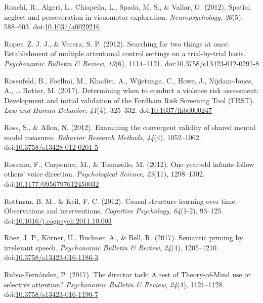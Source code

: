 \documentclass[english,man]{apa6}
\theoremstyle{definition}
\theoremstyle{definition}
\theoremstyle{definition}
\theoremstyle{remark}
\begin{document}
\hypertarget{ref-Ronchi2012}{}
Ronchi, R., Algeri, L., Chiapella, L., Spada, M. S., \& Vallar, G.
(2012). Spatial neglect and perseveration in visuomotor exploration.
\emph{Neuropsychology}, \emph{26}(5), 588--603.
doi:\href{https://doi.org/10.1037/a0029216}{10.1037/a0029216}

\hypertarget{ref-Roper2012}{}
Roper, Z. J. J., \& Vecera, S. P. (2012). Searching for two things at
once: Establishment of multiple attentional control settings on a
trial-by-trial basis. \emph{Psychonomic Bulletin \& Review},
\emph{19}(6), 1114--1121.
doi:\href{https://doi.org/10.3758/s13423-012-0297-8}{10.3758/s13423-012-0297-8}

\hypertarget{ref-Rosenfeld2017}{}
Rosenfeld, B., Foellmi, M., Khadivi, A., Wijetunga, C., Howe, J.,
Nijdam-Jones, A., \ldots{} Rotter, M. (2017). Determining when to
conduct a violence risk assessment: Development and initial validation
of the Fordham Risk Screening Tool (FRST). \emph{Law and Human
Behavior}, \emph{41}(4), 325--332.
doi:\href{https://doi.org/10.1037/lhb0000247}{10.1037/lhb0000247}

\hypertarget{ref-Ross2012}{}
Ross, S., \& Allen, N. (2012). Examining the convergent validity of
shared mental model measures. \emph{Behavior Research Methods},
\emph{44}(4), 1052--1062.
doi:\href{https://doi.org/10.3758/s13428-012-0201-5}{10.3758/s13428-012-0201-5}

\hypertarget{ref-Rossano2012}{}
Rossano, F., Carpenter, M., \& Tomasello, M. (2012). One-year-old
infants follow others' voice direction. \emph{Psychological Science},
\emph{23}(11), 1298--1302.
doi:\href{https://doi.org/10.1177/0956797612450032}{10.1177/0956797612450032}

\hypertarget{ref-Rottman2012}{}
Rottman, B. M., \& Keil, F. C. (2012). Causal structure learning over
time: Observations and interventions. \emph{Cognitive Psychology},
\emph{64}(1-2), 93--125.
doi:\href{https://doi.org/10.1016/j.cogpsych.2011.10.003}{10.1016/j.cogpsych.2011.10.003}

\hypertarget{ref-Roer2016}{}
Röer, J. P., Körner, U., Buchner, A., \& Bell, R. (2017). Semantic
priming by irrelevant speech. \emph{Psychonomic Bulletin \& Review},
\emph{24}(4), 1205--1210.
doi:\href{https://doi.org/10.3758/s13423-016-1186-3}{10.3758/s13423-016-1186-3}

\hypertarget{ref-Rubio-Fernandez2016}{}
Rubio-Fernández, P. (2017). The director task: A test of Theory-of-Mind
use or selective attention? \emph{Psychonomic Bulletin \& Review},
\emph{24}(4), 1121--1128.
doi:\href{https://doi.org/10.3758/s13423-016-1190-7}{10.3758/s13423-016-1190-7}
\end{document}
